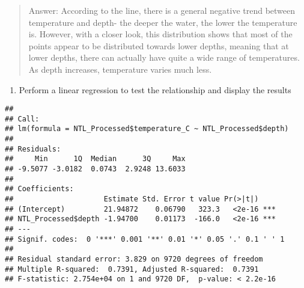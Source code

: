 \documentclass[
]{article}
\newenvironment{Shaded}{\begin{snugshade}}{\end{snugshade}}
\newcommand{\CommentTok}[1]{\textcolor[rgb]{0.56,0.35,0.01}{\textit{#1}}}
\newcommand{\KeywordTok}[1]{\textcolor[rgb]{0.13,0.29,0.53}{\textbf{#1}}}
\newcommand{\NormalTok}[1]{#1}
\newcommand{\OperatorTok}[1]{\textcolor[rgb]{0.81,0.36,0.00}{\textbf{#1}}}
\newcommand{\StringTok}[1]{\textcolor[rgb]{0.31,0.60,0.02}{#1}}
\providecommand{\tightlist}{%
  \setlength{\itemsep}{0pt}\setlength{\parskip}{0pt}}
\begin{document}
\begin{quote}
Answer: According to the line, there is a general negative trend between
temperature and depth- the deeper the water, the lower the temperature
is. However, with a closer look, this distribution shows that most of
the points appear to be distributed towards lower depths, meaning that
at lower depths, there can actually have quite a wide range of
temperatures. As depth increases, temperature varies much less.
\end{quote}

\begin{enumerate}
\def\labelenumi{\arabic{enumi}.}
\setcounter{enumi}{6}
\tightlist
\item
  Perform a linear regression to test the relationship and display the
  results
\end{enumerate}

\begin{Shaded}
\end{Shaded}

\begin{verbatim}
## 
## Call:
## lm(formula = NTL_Processed$temperature_C ~ NTL_Processed$depth)
## 
## Residuals:
##     Min      1Q  Median      3Q     Max 
## -9.5077 -3.0182  0.0743  2.9248 13.6033 
## 
## Coefficients:
##                     Estimate Std. Error t value Pr(>|t|)    
## (Intercept)         21.94872    0.06790   323.3   <2e-16 ***
## NTL_Processed$depth -1.94700    0.01173  -166.0   <2e-16 ***
## ---
## Signif. codes:  0 '***' 0.001 '**' 0.01 '*' 0.05 '.' 0.1 ' ' 1
## 
## Residual standard error: 3.829 on 9720 degrees of freedom
## Multiple R-squared:  0.7391, Adjusted R-squared:  0.7391 
## F-statistic: 2.754e+04 on 1 and 9720 DF,  p-value: < 2.2e-16
\end{verbatim}

\begin{Shaded}
\end{Shaded}
\end{document}
